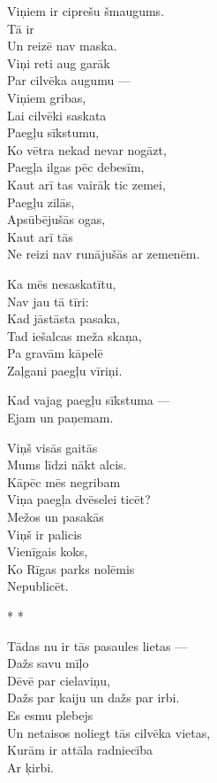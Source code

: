 \documentclass[14pt]{extarticle}
\begin{document}
Viņiem ir ciprešu šmaugums.\\
Tā ir\\
Un reizē nav maska.\\
Viņi reti aug garāk\\
Par cilvēka augumu ---\\
Viņiem gribas,\\
Lai cilvēki saskata\\
Paegļu sīkstumu,\\
Ko vētra nekad nevar nogāzt,\\
Paegļa ilgas pēc debesīm,\\
Kaut arī tas vairāk tic zemei,\\
Paegļu zilās,\\
Apsūbējušās ogas,\\
Kaut arī tās\\
Ne reizi nav runājušās ar zemenēm.

Ka mēs nesaskatītu,\\
Nav jau tā tīri:\\
Kad jāstāsta pasaka,\\
Tad iešalcas meža skaņa,\\
Pa gravām kāpelē\\
Zaļgani paegļu vīriņi.

Kad vajag paegļu sīkstuma ---\\
Ejam un paņemam.

Viņš visās gaitās\\
Mums līdzi nākt alcis.\\
Kāpēc mēs negribam\\
Viņa paegļa dvēselei ticēt?\\
Mežos un pasakās\\
Viņš ir palicis\\
Vienīgais koks,\\
Ko Rīgas parks nolēmis\\
Nepublicēt.



\newpage

{\large \sc * * *}

Tādas nu ir tās pasaules lietas ---\\
Dažs savu mīļo\\
Dēvē par cielaviņu,\\
Dažs par kaiju un dažs par irbi.\\
Es esmu plebejs\\
Un netaisos noliegt tās cilvēka vietas,\\
Kurām ir attāla radniecība\\
Ar ķirbi.
\end{document}
